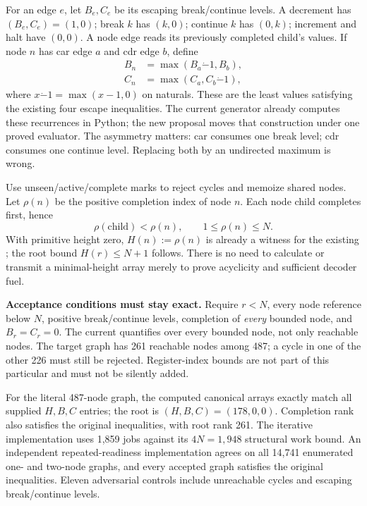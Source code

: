 \documentclass[11pt]{article}
\newcommand{\file}[1]{{\small\path{#1}}}
\begin{document}
For an edge $e$, let $B_e,C_e$ be its escaping break/continue levels. A decrement has $(B_e,C_e)=(1,0)$; break $k$ has $(k,0)$; continue $k$ has $(0,k)$; increment and halt have $(0,0)$. A node edge reads its previously completed child's values. If node $n$ has car edge $a$ and cdr edge $b$, define
\begin{align*}
 B_n&=\max(B_a\mathbin{\dot-}1,B_b),\\
 C_n&=\max(C_a,C_b\mathbin{\dot-}1),
\end{align*}
where $x\mathbin{\dot-}1=\max(x-1,0)$ on naturals. These are the least values satisfying the existing four escape inequalities. The current generator already computes these recurrences in Python; the new proposal moves that construction under one proved evaluator. The asymmetry matters: car consumes one break level; cdr consumes one continue level. Replacing both by an undirected maximum is wrong.

Use unseen/active/complete marks to reject cycles and memoize shared nodes. Let $\rho(n)$ be the positive completion index of node $n$. Each node child completes first, hence
\[
 \rho(\mathrm{child})<\rho(n),\qquad 1\leq\rho(n)\leq N.
\]
With primitive height zero, $H(n):=\rho(n)$ is already a witness for the existing \file{RMEquiv.WF.height}; the root bound $H(r)\leq N+1$ follows. There is no need to calculate or transmit a minimal-height array merely to prove acyclicity and sufficient decoder fuel.

\textbf{Acceptance conditions must stay exact.} Require $r<N$, every node reference below $N$, positive break/continue levels, completion of \emph{every} bounded node, and $B_r=C_r=0$. The current \file{WF} quantifies over every bounded node, not only reachable nodes. The target graph has 261 reachable nodes among 487; a cycle in one of the other 226 must still be rejected. Register-index bounds are not part of this particular \file{WF} and must not be silently added.

For the literal 487-node graph, the computed canonical arrays exactly match all supplied $H,B,C$ entries; the root is $(H,B,C)=(178,0,0)$. Completion rank also satisfies the original inequalities, with root rank 261. The iterative implementation uses 1,859 jobs against its $4N=1,948$ structural work bound. An independent repeated-readiness implementation agrees on all 14,741 enumerated one- and two-node graphs, and every accepted graph satisfies the original inequalities. Eleven adversarial controls include unreachable cycles and escaping break/continue levels.
\end{document}
